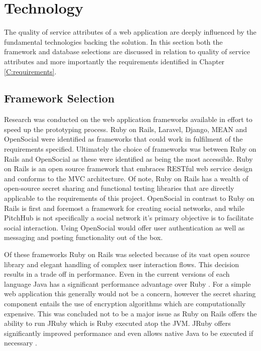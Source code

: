 \section{Technology}

The quality of service attributes of a web application are deeply influenced by the fundamental technologies backing the solution. In this section both the framework and database selections are discussed in relation to quality of service attributes and more importantly the requirements identified in Chapter \ref{C:requirements}.

\subsection{Framework Selection}\label{SS:frameworkSelection}

Research was conducted on the web application frameworks available in effort to speed up the prototyping process. Ruby on Rails, Laravel, Django, MEAN and OpenSocial were identified as frameworks that could work in fulfilment of the requirements specified. Ultimately the choice of frameworks was between Ruby on Rails and OpenSocial as these were identified as being the most accessible. Ruby on Rails is an open source framework that embraces RESTful web service design and conforms to the MVC architecture. Of note, Ruby on Rails has a wealth of open-source secret sharing and functional testing libraries that are directly applicable to the requirements of this project. OpenSocial in contrast to Ruby on Rails is first and foremost a framework for creating social networks, and while PitchHub is not specifically a social network it's primary objective is to facilitate social interaction. Using OpenSocial would offer user authentication as well as messaging and posting functionality out of the box. 
\par
Of these frameworks Ruby on Rails was selected because of its vast open source library and elegant handling of complex user interaction flows. This decision results in a trade off in performance. Even in the current versions of each language Java has a significant  performance advantage over Ruby \cite{Perfo1:online}. For a simple web application this generally would not be a concern, however the secret sharing component entails the use of encryption algorithms which are computationally expensive. This was concluded not to be a major issue as Ruby on Rails offers the ability to run JRuby which is Ruby executed atop the JVM. JRuby offers significantly improved performance and even allows native Java to be executed if necessary \cite{Jruby:online}.

